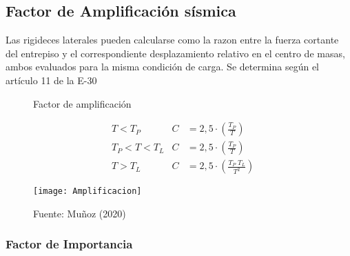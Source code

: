 \documentclass{article}%
\begin{document}
%
\subsection{Factor de Amplificación sísmica}%
\label{subsec:FactordeAmplificacinssmica}%
Las rigideces laterales pueden calcularse como la razon entre la fuerza cortante del entrepiso y el correspondiente desplazamiento relativo en el centro de masas, ambos evaluados para la misma condición de carga. \newline%
%
Se determina según el artículo 11 de la E{-}30%
\setlength{\jot}{0.5cm}%


\begin{figure}[h!]%
\caption{Factor de amplificación}%
\begin{minipage}{0.5\textwidth}%

    \begin{align*}
        &T< T_{P}         &   C&=2,5\cdot\left ( \frac{T_{P}}{T} \right )\\
        &T_{P}< T< T_{L}  &   C&=2,5\cdot\left ( \frac{T_{P}}{T} \right )\\
        &T> T_{L}         &   C&=2,5\cdot\left ( \frac{T_{P}\;T_{L}}{T^{2}} \right )
    \end{align*}%
\end{minipage}%
\begin{minipage}{0.4\textwidth}%
\centering%
\texttt{[image: Amplificacion]}%
\end{minipage}%
\caption*{Fuente: Muñoz (2020)}%
\end{figure}

%
\subsubsection{Factor de Importancia}%
\label{ssubsec:FactordeImportancia}%
%
\end{document}
